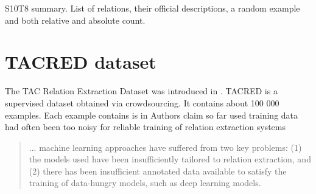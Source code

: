 \begin{table}
\caption{S10T8 summary. List of relations, their official descriptions, a random example and both relative and absolute count.}


\end{table}



\section{TACRED dataset}
The TAC Relation Extraction Dataset was introduced in \cite{zhang2017tacred}. TACRED is a supervised dataset obtained via crowdsourcing. It contains about 100 000 examples. Each example contains  is in  Authors claim so far used training data had often been too noisy for reliable training of relation extraction systems


\begin{quotation}
... machine learning approaches have suffered from two key problems: (1) the models used have been insufficiently tailored to relation extraction, and (2) there has been insufficient annotated data available to satisfy the training of data-hungry models, such as deep learning models.
\end{quotation} 